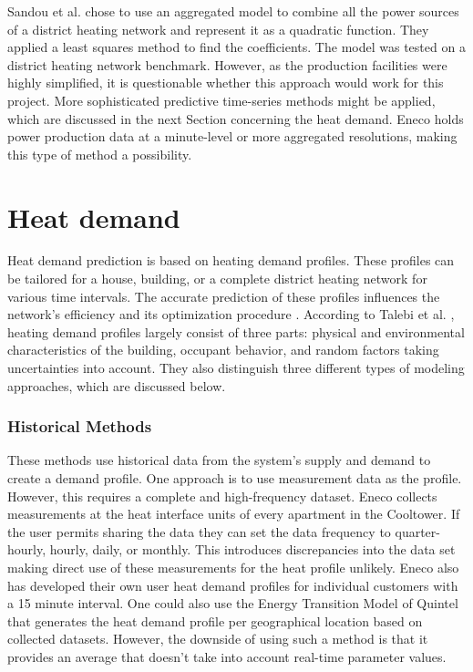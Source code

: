 Sandou et al.\cite{Sandou2005} chose to use an aggregated model to combine all the power sources of a district heating network and represent it as a quadratic function. They applied a least squares method to find the coefficients. The model was tested on a district heating network benchmark. However, as the production facilities were highly simplified, it is questionable whether this approach would work for this project. More sophisticated predictive time-series methods might be applied, which are discussed in the next Section concerning the heat demand. Eneco holds power production data at a minute-level or more aggregated resolutions, making this type of method a possibility.  


\section{Heat demand}
Heat demand prediction is based on heating demand profiles. These profiles can be tailored for a house, building, or a complete district heating network for various time intervals. The accurate prediction of these profiles influences the network's efficiency and its optimization procedure \cite{ORTIGA20071121}. According to Talebi et al. \cite{Talebi}, heating demand profiles largely consist of three parts: physical and environmental characteristics of the building, occupant behavior, and random factors taking uncertainties into account. They also distinguish three different types of modeling approaches, which are discussed below. 

\subsubsection{Historical Methods}
These methods use historical data from the system's supply and demand to create a demand profile. One approach is to use measurement data as the profile. However, this requires a complete and high-frequency dataset. Eneco collects measurements at the heat interface units of every apartment in the Cooltower. If the user permits sharing the data they can set the data frequency to quarter-hourly, hourly, daily, or monthly. This introduces discrepancies into the data set making direct use of these measurements for the heat profile unlikely. Eneco also has developed their own user heat demand profiles for individual customers with a 15 minute interval. One could also use the Energy Transition Model of Quintel \cite{quintel} that generates the heat demand profile per geographical location based on collected datasets. However, the downside of using such a method is that it provides an average that doesn't take into account real-time parameter values. 

